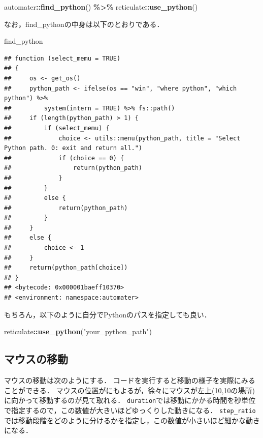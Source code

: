 \documentclass[
]{article}
\newenvironment{Shaded}{\begin{snugshade}}{\end{snugshade}}
\newcommand{\FunctionTok}[1]{\textcolor[rgb]{0.13,0.29,0.53}{\textbf{#1}}}
\newcommand{\NormalTok}[1]{#1}
\newcommand{\SpecialCharTok}[1]{\textcolor[rgb]{0.81,0.36,0.00}{\textbf{#1}}}
\newcommand{\StringTok}[1]{\textcolor[rgb]{0.31,0.60,0.02}{#1}}
\begin{document}
\begin{Shaded}
\begin{Highlighting}[]
\NormalTok{automater}\SpecialCharTok{::}\FunctionTok{find\_python}\NormalTok{() }\SpecialCharTok{\%\textgreater{}\%}
\NormalTok{  reticulate}\SpecialCharTok{::}\FunctionTok{use\_python}\NormalTok{()}
\end{Highlighting}
\end{Shaded}

なお，find\_pythonの中身は以下のとおりである．

\begin{Shaded}
\begin{Highlighting}[]
\NormalTok{find\_python}
\end{Highlighting}
\end{Shaded}

\begin{verbatim}
## function (select_memu = TRUE) 
## {
##     os <- get_os()
##     python_path <- ifelse(os == "win", "where python", "which python") %>% 
##         system(intern = TRUE) %>% fs::path()
##     if (length(python_path) > 1) {
##         if (select_memu) {
##             choice <- utils::menu(python_path, title = "Select Python path. 0: exit and return all.")
##             if (choice == 0) {
##                 return(python_path)
##             }
##         }
##         else {
##             return(python_path)
##         }
##     }
##     else {
##         choice <- 1
##     }
##     return(python_path[choice])
## }
## <bytecode: 0x000001baeff10370>
## <environment: namespace:automater>
\end{verbatim}

もちろん，以下のように自分でPythonのパスを指定しても良い．

\begin{Shaded}
\begin{Highlighting}[]
\NormalTok{reticulate}\SpecialCharTok{::}\FunctionTok{use\_python}\NormalTok{(}\StringTok{"your\_python\_path"}\NormalTok{)}
\end{Highlighting}
\end{Shaded}

\hypertarget{ux30deux30a6ux30b9ux306eux79fbux52d5}{%
\subsection{マウスの移動}\label{ux30deux30a6ux30b9ux306eux79fbux52d5}}

マウスの移動は次のようにする．
コードを実行すると移動の様子を実際にみることができる．
マウスの位置がにもよるが，徐々にマウスが左上(10,10の場所)に向かって移動するのが見て取れる．
\texttt{duration}では移動にかかる時間を秒単位で指定するので，この数値が大きいほどゆっくりした動きになる．
\texttt{step\_ratio}では移動段階をどのように分けるかを指定し，この数値が小さいほど細かな動きになる．
\end{document}
